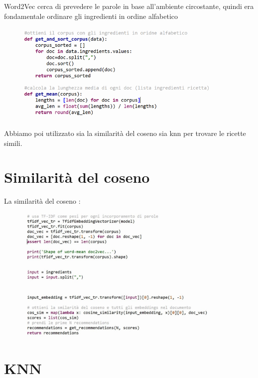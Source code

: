\documentclass[12pt]{report}
\begin{document}
Word2Vec cerca di prevedere le parole in base all'ambiente circostante, quindi era fondamentale ordinare gli ingredienti in ordine alfabetico

\begin{figure}[H]
        \centering
        {\includegraphics[width=0.9\textwidth]{img/img15.jpg}}
\end{figure}

Abbiamo poi utilizzato sia la similarità del coseno sia knn per trovare le ricette simili.

\section{Similarità del coseno}

La similarità del coseno : 

\begin{figure}[H]
        \centering
        {\includegraphics[width=0.9\textwidth]{img/img16.jpg}}
\end{figure}

\section{KNN}
\end{document}

